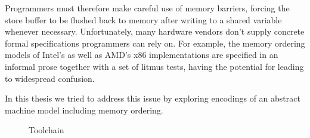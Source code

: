 Programmers must therefore make careful use of memory barriers,
forcing the store buffer to be flushed back to memory after writing to a shared variable whenever necessary.
Unfortunately, many hardware vendors don't supply concrete formal specifications programmers can rely on.
For example, the memory ordering models of Intel's \cite{ref:Intel} as well as AMD's \cite{ref:AMD} x86 implementations are specified in an informal prose together with a set of litmus tests, having the potential for leading to widespread confusion.


\bigskip
\noindent
In this thesis we tried to address this issue by exploring encodings of an abstract machine model including memory ordering.

\begin{figure}[h]
  \centering
  
  \caption{Toolchain}
\end{figure}

